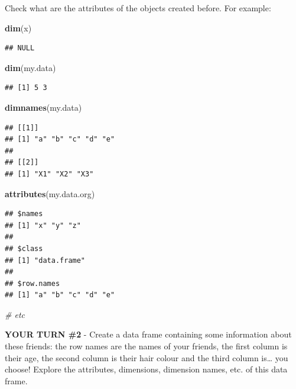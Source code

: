 \documentclass[
]{article}
\newenvironment{Shaded}{\begin{snugshade}}{\end{snugshade}}
\newcommand{\CommentTok}[1]{\textcolor[rgb]{0.56,0.35,0.01}{\textit{#1}}}
\newcommand{\KeywordTok}[1]{\textcolor[rgb]{0.13,0.29,0.53}{\textbf{#1}}}
\newcommand{\NormalTok}[1]{#1}
\begin{document}
Check what are the attributes of the objects created before. For
example:

\begin{Shaded}
\begin{Highlighting}[]
\KeywordTok{dim}\NormalTok{(x)}
\end{Highlighting}
\end{Shaded}

\begin{verbatim}
## NULL
\end{verbatim}

\begin{Shaded}
\begin{Highlighting}[]
\KeywordTok{dim}\NormalTok{(my.data)}
\end{Highlighting}
\end{Shaded}

\begin{verbatim}
## [1] 5 3
\end{verbatim}

\begin{Shaded}
\begin{Highlighting}[]
\KeywordTok{dimnames}\NormalTok{(my.data)}
\end{Highlighting}
\end{Shaded}

\begin{verbatim}
## [[1]]
## [1] "a" "b" "c" "d" "e"
## 
## [[2]]
## [1] "X1" "X2" "X3"
\end{verbatim}

\begin{Shaded}
\begin{Highlighting}[]
\KeywordTok{attributes}\NormalTok{(my.data.org)}
\end{Highlighting}
\end{Shaded}

\begin{verbatim}
## $names
## [1] "x" "y" "z"
## 
## $class
## [1] "data.frame"
## 
## $row.names
## [1] "a" "b" "c" "d" "e"
\end{verbatim}

\begin{Shaded}
\begin{Highlighting}[]
\CommentTok{# etc}
\end{Highlighting}
\end{Shaded}

\textbf{YOUR TURN \#2} - Create a data frame containing some information
about these friends: the row names are the names of your friends, the
first column is their age, the second column is their hair colour and
the third column is\ldots{} you choose! Explore the attributes,
dimensions, dimension names, etc. of this data frame.
\end{document}
